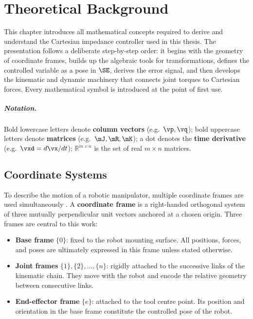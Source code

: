 \chapter{Theoretical Background}
\label{ch:theory}

This chapter introduces all mathematical concepts required to derive and
understand the Cartesian impedance controller used in this thesis.
The presentation follows a deliberate step-by-step order:
it begins with the geometry of coordinate frames, builds up the algebraic
tools for transformations, defines the controlled variable as a pose in
$\SE$, derives the error signal, and then develops the kinematic
and dynamic machinery that connects joint torques to Cartesian forces.
Every mathematical symbol is introduced at the point of first use.

\paragraph{Notation.}
Bold lowercase letters denote \textbf{column vectors}
(e.g.\ $\vp,\vq$); bold uppercase letters denote \textbf{matrices}
(e.g.\ $\mJ,\mR,\mK$); a dot denotes the \textbf{time derivative}
(e.g.\ $\vxd = d\vx/dt$); $\mathbb{R}^{m\times n}$ is the set of
real $m\times n$ matrices.

\section{Coordinate Systems}
\label{sec:coord_systems}

To describe the motion of a robotic manipulator, multiple coordinate
frames are used simultaneously \cite{Siciliano2009, Craig2005}.
A \textbf{coordinate frame} is a right-handed orthogonal system of
three mutually perpendicular unit vectors anchored at a chosen origin.
Three frames are central to this work:

\begin{itemize}
  \item \textbf{Base frame} $\{0\}$: fixed to the robot mounting
        surface.
        All positions, forces, and poses are ultimately expressed in
        this frame unless stated otherwise.
  \item \textbf{Joint frames} $\{1\},\{2\},\ldots,\{n\}$: rigidly
        attached to the successive links of the kinematic chain.
        They move with the robot and encode the relative geometry
        between consecutive links.
  \item \textbf{End-effector frame} $\{e\}$: attached to the tool
        centre point.
        Its position and orientation in the base frame constitute the
        controlled pose of the robot.
\end{itemize}


